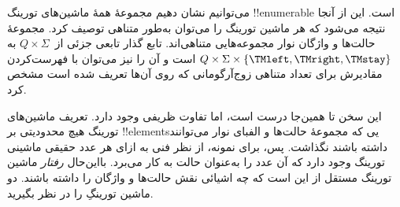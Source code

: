 \documentclass[../../../include/open-logic-section]{subfiles}
\begin{document}

\begin{explain}
می‌توانیم نشان دهیم مجموعهٔ همهٔ ماشین‌های تورینگ !!{enumerable} است.
این از آنجا نتیجه می‌شود که هر ماشین تورینگ را می‌توان به‌طور متناهی
توصیف کرد. مجموعهٔ حالت‌ها و واژگان نوار مجموعه‌هایی متناهی‌اند. تابع
گذار تابعی جزئی از~$Q\times\Sigma$ به
$Q\times\Sigma\times\{\TMleft,\TMright,\TMstay\}$ است و آن را نیز
می‌توان با فهرست‌کردن مقادیرش برای تعداد متناهی زوج‌آرگومانی که روی
آن‌ها تعریف شده است مشخص کرد.

این سخن تا همین‌جا درست است، اما تفاوت ظریفی وجود دارد. تعریف
ماشین‌های تورینگ هیچ محدودیتی بر !!{element}sیی که مجموعهٔ حالت‌ها و
الفبای نوار می‌توانند داشته باشند نگذاشت. پس، برای نمونه، از نظر فنی
به ازای هر عدد حقیقی ماشینی تورینگ وجود دارد که آن عدد را به‌عنوان
حالت به کار می‌برد. بااین‌حال \emph{رفتار} ماشین تورینگ مستقل از این
است که چه اشیائی نقش حالت‌ها و واژگان را داشته باشند. دو ماشین
تورینگِ  را در نظر بگیرید.
\begin{figure}
\begin{center}
\\
\end{center}
\end{figure}
\end{explain}
\end{document}
